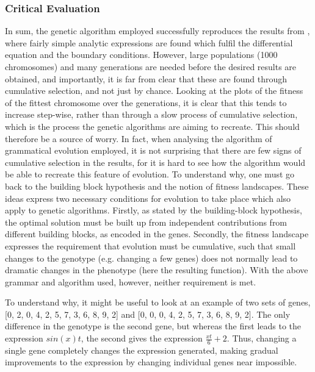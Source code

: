 \documentclass[multicolumn, 10pt]{extarticle}
\begin{document}
\subsubsection{Critical Evaluation}
In sum, the genetic algorithm employed successfully reproduces the results from \cite{Lagaris}, where fairly simple analytic expressions are found which fulfil the differential equation and the boundary conditions. However, large populations (1000 chromosomes) and many generations are needed before the desired results are obtained, and importantly, it is far from clear that these are found through cumulative selection, and not just by chance. Looking at the plots of the fitness of the fittest chromosome over the generations, it is clear that this tends to increase step-wise, rather than through a slow process of cumulative selection, which is the process the genetic algorithms are aiming to recreate. This should therefore be a source of worry. In fact, when analysing the algorithm of grammatical evolution employed, it is not surprising that there are few signs of cumulative selection in the results, for it is hard to see how the algorithm would be able to recreate this feature of evolution. To understand why, one must go back to the building block hypothesis and the notion of fitness landscapes. These ideas express two necessary conditions for evolution to take place which also apply to genetic algorithms. Firstly, as stated by the building-block hypothesis, the optimal solution must be built up from independent contributions from different building blocks, as encoded in the genes. Secondly, the fitness landscape expresses the requirement that evolution must be cumulative, such that small changes to the genotype (e.g. changing a few genes) does not normally lead to dramatic changes in the phenotype (here the resulting function). With the above grammar and algorithm used, however, neither requirement is met.

To understand why, it might be useful to look at an example of two sets of genes, [0, 2, 0, 4, 2, 5, 7, 3, 6, 8, 9, 2] and [0, 0, 0, 4, 2, 5, 7, 3, 6, 8, 9, 2]. The only difference in the genotype is the second gene, but whereas the first leads to the expression $sin(x)t$, the second gives the expression $\frac{xt}{6} + 2$. Thus, changing a single gene completely changes the expression generated, making gradual improvements to the expression by changing individual genes near impossible.
\end{document}
